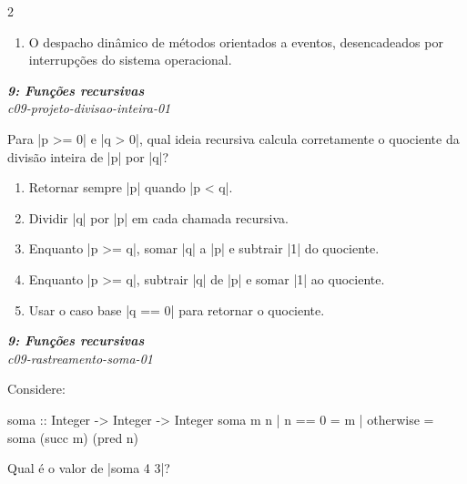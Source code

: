 \documentclass[a4paper,10pt,brazil]{article}
\begin{document}
\begin{multicols}{2}
\begin{enumerate}
  \item O despacho dinâmico de métodos orientados a eventos, desencadeados por interrupções do sistema operacional.


\end{enumerate}

\begin{flushright}
  \footnotesize
  \textit{\textbf{9: Funções recursivas}}\\
  \textit{c09-projeto-divisao-inteira-01}\\

\end{flushright}
Para \haskellinline|p >= 0| e \haskellinline|q > 0|, qual ideia recursiva calcula corretamente o quociente da divisão inteira de \haskellinline|p| por \haskellinline|q|?

\begin{enumerate}
  \item Retornar sempre \haskellinline|p| quando \haskellinline|p < q|.

  \item Dividir \haskellinline|q| por \haskellinline|p| em cada chamada recursiva.

  \item Enquanto \haskellinline|p >= q|, somar \haskellinline|q| a \haskellinline|p| e subtrair \haskellinline|1| do quociente.

  \item Enquanto \haskellinline|p >= q|, subtrair \haskellinline|q| de \haskellinline|p| e somar \haskellinline|1| ao quociente.

  \item Usar o caso base \haskellinline|q == 0| para retornar o quociente.


\end{enumerate}

\begin{flushright}
  \footnotesize
  \textit{\textbf{9: Funções recursivas}}\\
  \textit{c09-rastreamento-soma-01}\\

\end{flushright}
Considere:
\begin{haskellcode}
soma :: Integer -> Integer -> Integer
soma m n
  | n == 0    = m
  | otherwise = soma (succ m) (pred n)
\end{haskellcode}
Qual é o valor de \haskellinline|soma 4 3|?


\end{multicols}
\end{document}

